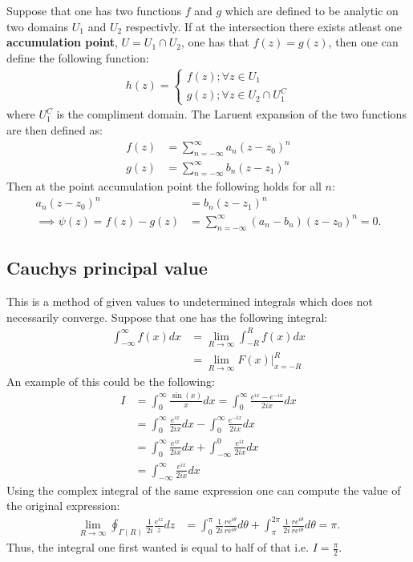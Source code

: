 \documentclass[12pt]{article}
\begin{document}
\vspace{0.5cm}\noindent
Suppose that one has two functions $f$ and $g$ which are defined to be analytic on two domains $U_1$ and $U_2$ respectivly. If at the intersection there exists atleast one \textbf{accumulation point}, $ U = U_1\cap U_2$, one has that $f(z) = g(z)$, then one can define the following function:
\begin{align*}
    h(z) = \begin{cases}
        f(z); \forall z\in U_1\\
        g(z); \forall z\in U_2\cap U_1^C
    \end{cases}
\end{align*}where $U_1^C$ is the compliment domain. The Laruent expansion of the two functions are then defined as:
\begin{align*}
    f(z) &= \sum_{n = -\infty}^\infty a_n(z - z_0)^n\\
    g(z) &= \sum_{n = -\infty}^\infty b_n(z - z_1)^n
\end{align*}Then at the point accumulation point the following holds for all $n$:
\begin{align*}
    a_n(z-z_0)^n &= b_n(z-z_1)^n\\
    \implies \psi(z) = f(z) - g(z) &= \sum_{n = -\infty}^\infty (a_n - b_n)(z - z_0)^n = 0.
\end{align*}
\subsection{Cauchys principal value}
This is a method of given values to undetermined integrals which does not necessarily converge. Suppose that one has the following integral:
\begin{align*}
    \int_{-\infty}^\infty f(x)dx &= \lim_{R\to\infty}\int_{-R}^R f(x)dx\\
    &= \lim_{R\to\infty} F(x)\Bigg|_{x = -R}^R
\end{align*}An example of this could be the following:
\begin{align*}
    I &= \int_{0}^\infty \frac{\sin(x)}{x}dx = \int_0^\infty \frac{e^{ix} - e^{-ix}}{2ix}dx\\
    &= \int_0^\infty \frac{e^{ix}}{2ix}dx - \int_{0}^{\infty}\frac{e^{-ix}}{2ix}dx\\
    &= \int_0^\infty \frac{e^{ix}}{2ix}dx + \int_{-\infty}^{0}\frac{e^{ix}}{2ix}dx\\
    &= \int_{-\infty}^\infty \frac{e^{ix}}{2ix}dx
\end{align*}Using the complex integral of the same expression one can compute the value of the original expression:
\begin{align*}
    \lim_{R\to\infty}\oint_{\Gamma(R)}\frac{1}{2i}\frac{e^{iz}}{z}dz&= \int_{0}^\pi \frac{1}{2i}\frac{re^{i\theta}}{re^{i\theta}}d\theta +  \int_{\pi}^{2\pi} \frac{1}{2i}\frac{re^{i\theta}}{re^{i\theta}}d\theta = \pi.
\end{align*}Thus, the integral one first wanted is equal to half of that i.e. $I = \frac{\pi}{2}$.
\end{document}
